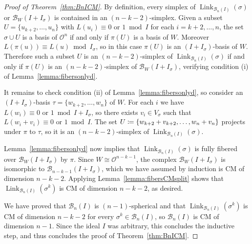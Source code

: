 \documentclass[11 pt]{article}
\theoremstyle{plain}
\theoremstyle{definition}
\numberwithin{equation}{section}
\renewcommand{\O}{\mathcal{O}}
\newcommand\PartialBases{\ensuremath{\mathcal{B}}}
\newcommand{\PB}{\PartialBases}
\DeclareMathOperator{\Link}{Link}
\newcommand\coloneq{\mathrel{\mathop:}\mkern-1.2mu=}
\newcommand\iso{\cong}
\begin{document}
\begin{proof}[Proof of Theorem~\ref{thm:BnICM}]
By definition, every simplex of $\Link_{\PB_n(I)}(\sigma)$ or $\PB_W(I+I_\sigma)$ is contained in an $(n-k-2)$-simplex. Given a subset $U=\{u_{k+2},\ldots,u_n\}$ with $L(u_i)\equiv 0\text{ or }1\bmod{I}$ for each $i=k+2,\ldots,n$, the set $\sigma\cup U$ is a basis of $\O^n$ if and only if $\pi(U)$ is a basis of $W$. Moreover $L(\pi(u))\equiv L(u)\bmod{I_\sigma}$, so in this case $\pi(U)$ is an $(I+I_\sigma)$-basis of $W$. Therefore such a subset $U$ is an $(n-k-2)$-simplex of $\Link_{\PB_n(I)}(\sigma)$ if and only if $\pi(U)$ is an $(n-k-2)$-simplex of $\PB_W(I+I_\sigma)$, verifying condition (i) of Lemma~\ref{lemma:fibersonlyd}.

It remains to check condition (ii) of Lemma~\ref{lemma:fibersonlyd}, so consider an $(I+I_\sigma)$-basis $\tau=\{w_{k+2},\ldots,w_n\}$ of $W$. For each $i$ we have $L(w_i)\equiv 0\text{ or }1\bmod{I+I_\sigma}$, so there exists $v_i\in V_\sigma$ such that $L(w_i+v_i)\equiv 0\text{ or }1\bmod{I}$. The set $U\coloneq \{w_{k+2}+v_{k+2},\ldots,w_n+v_n\}$ projects under $\pi$ to $\tau$, so it is an $(n-k-2)$-simplex of $\Link_{\PB_n(I)}(\sigma)$. 

 Lemma~\ref{lemma:fibersonlyd} now implies that  $\Link_{\PB_n(I)}(\sigma)$ is fully fibered over $\PB_W(I+I_\sigma)$ by $\pi$. Since $W\iso \O^{n-k-1}$, the complex $\PB_W(I+I_\sigma)$ is isomorphic to $\PB_{n-k-1}(I+I_\sigma)$, which we have assumed by induction  is CM of dimension $n-k-2$. Applying Lemma~\ref{lemma:fibersCMsplit} shows that $\Link_{\PB_n(I)}(\sigma^k)$ is CM of dimension $n-k-2$, as desired.

We have proved that $\PB_n(I)$ is $(n-1)$-spherical and that $\Link_{\PB_n(I)}(\sigma^k)$ is CM of dimension $n-k-2$ for every $\sigma^k\in \PB_n(I)$, so $\PB_n(I)$ is CM of dimension $n-1$. Since the ideal $I$ was arbitrary, this concludes the inductive step, and thus concludes the proof of Theorem~\ref{thm:BnICM}.
\end{proof}
\end{document}
